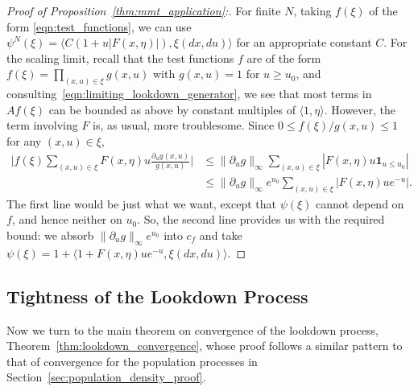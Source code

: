 \documentclass[EJP]{ejpecp} %
\newcommand{\ind}{\mathbf{1}}
\newcommand{\lp}{\xi}              %
\newcommand{\citep}[1]{\cite{#1}}
\begin{document}
\begin{proof}[Proof of Proposition~\ref{thm:mmt_application}:]
    For finite $N$,
    taking $f(\lp)$ of the form \eqref{eqn:test_functions},
    we can use $\psi^N(\lp) = \langle C (1 + u |F(x, \eta)|), \lp(dx, du) \rangle$
    for an appropriate constant $C$.
    For the scaling limit, recall that the test functions $f$ are of the form
    $f(\lp) = \prod_{(x, u) \in \lp} g(x, u)$
    with $g(x, u) = 1$ for $u \ge u_0$,
    and consulting~\eqref{eqn:limiting_lookdown_generator},
    we see that most terms in $Af(\lp)$ can be bounded 
    as above by constant multiples of $\langle 1, \eta \rangle$.
    However, the term involving $F$ is, as usual, more troublesome.
    Since $0 \le f(\lp) / g(x, u) \le 1$ for any $(x, u) \in \lp$,
    \begin{align*} %
        \big| f(\lp) \sum_{(x, u) \in \lp} F(x, \eta) u \frac{\partial_u g(x, u)}{g(x, u)} \big|
        & \le
        \| \partial_u g \|_\infty \sum_{(x, u) \in \lp} | F(x, \eta) u \ind_{u \le u_0} | \\
        & \le
        \| \partial_u g \|_\infty e^{u_0} \sum_{(x, u) \in \lp} | F(x, \eta) u e^{-u} | .
    \end{align*}
    The first line would be just what we want,
    except that $\psi(\lp)$ cannot depend on $f$, and hence neither on $u_0$.
    So, the second line provides us with the required bound:
    we absorb $\| \partial_u g \|_\infty e^{u_0}$ into $c_f$
    and take $\psi(\lp) = 1 + \langle 1 + F(x, \eta) u e^{-u}, \lp(dx, du) \rangle$.
\end{proof}


\subsection{Tightness of the Lookdown Process}
    \label{sec:lookdown_convergence}

Now we turn to the main theorem on convergence of the lookdown process, 
Theorem~\ref{thm:lookdown_convergence}, whose proof
follows a similar pattern to that of convergence for the population processes
in Section~\ref{sec:population_density_proof}.
\end{document}
